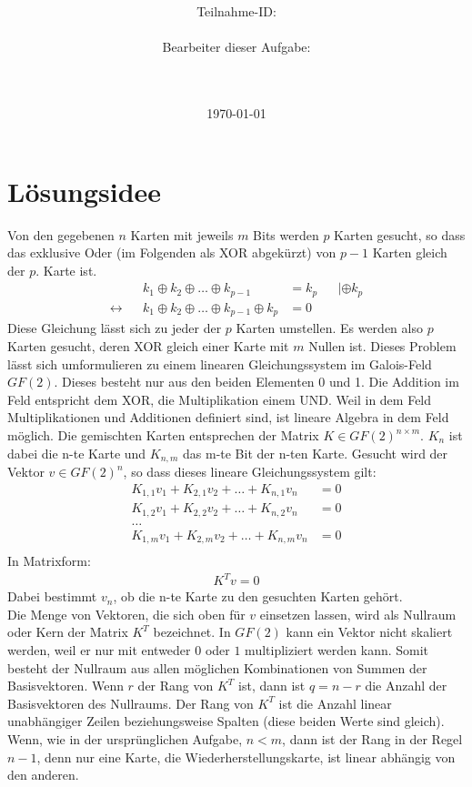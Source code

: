 \documentclass[a4paper,10pt,ngerman]{scrartcl}
\title{\textbf{\Huge\Aufgabe}}
\author{\LARGE Teilnahme-ID: \LARGE \TeamId \\\\
	    \LARGE Bearbeiter dieser Aufgabe: \\ 
	    \LARGE \Namen\\\\}
\date{\LARGE\today}
\newcommand*\xor{\oplus}
\begin{document}
\maketitle
\tableofcontents

\vspace{0.5cm}



\section{Lösungsidee}
Von den gegebenen $n$ Karten mit jeweils $m$ Bits werden $p$ Karten gesucht, so dass das exklusive Oder (im Folgenden als XOR abgekürzt) von $p-1$ Karten gleich der $p.$ Karte ist.
\begin{align*}
&& k_1 \xor k_2 \xor \ldots \xor k_{p-1} &= k_p && |\xor k_p \\
\leftrightarrow && k_1 \xor k_2 \xor \ldots \xor k_{p-1} \xor k_p &= 0 &&
\end{align*}
Diese Gleichung lässt sich zu jeder der $p$ Karten umstellen. Es werden also $p$ Karten gesucht, deren XOR gleich einer Karte mit $m$ Nullen ist. Dieses Problem lässt sich umformulieren zu einem linearen Gleichungssystem im Galois-Feld $GF(2)$. Dieses besteht nur aus den beiden Elementen 0 und 1. Die Addition im Feld entspricht dem XOR, die Multiplikation einem UND. Weil in dem Feld Multiplikationen und Additionen definiert sind, ist lineare Algebra in dem Feld möglich. Die gemischten Karten entsprechen der Matrix $K \in GF(2)^{n \times m}$. $K_n$ ist dabei die n-te Karte und $K_{n,m}$ das m-te Bit der n-ten Karte. Gesucht wird der Vektor $v \in GF(2)^n$, so dass dieses lineare Gleichungssystem gilt:
\begin{align*}
K_{1, 1} v_1 + K_{2, 1} v_2 + \ldots + K_{n, 1} v_n &= 0 \\
K_{1, 2} v_1 + K_{2, 2} v_2 + \ldots + K_{n, 2} v_n &= 0 \\
\ldots \\
K_{1, m} v_1 + K_{2, m} v_2 + \ldots + K_{n, m} v_n &= 0 \\ 
\end{align*}
In Matrixform:
\begin{align*}
K^T v = 0
\end{align*}
Dabei bestimmt $v_n$, ob die n-te Karte zu den gesuchten Karten gehört. \\
Die Menge von Vektoren, die sich oben für $v$ einsetzen lassen, wird als Nullraum oder Kern der Matrix $K^T$ bezeichnet. In $GF(2)$ kann ein Vektor nicht skaliert werden, weil er nur mit entweder $0$ oder $1$ multipliziert werden kann. Somit besteht der Nullraum aus allen möglichen Kombinationen von Summen der Basisvektoren. Wenn $r$ der Rang von $K^T$ ist, dann ist $q=n-r$ die Anzahl der Basisvektoren des Nullraums. Der Rang von $K^T$ ist die Anzahl linear unabhängiger Zeilen beziehungsweise Spalten (diese beiden Werte sind gleich). Wenn, wie in der ursprünglichen Aufgabe, $n<m$, dann ist der Rang in der Regel $n-1$, denn nur eine Karte, die Wiederherstellungskarte, ist linear abhängig von den anderen. \\
\end{document}
